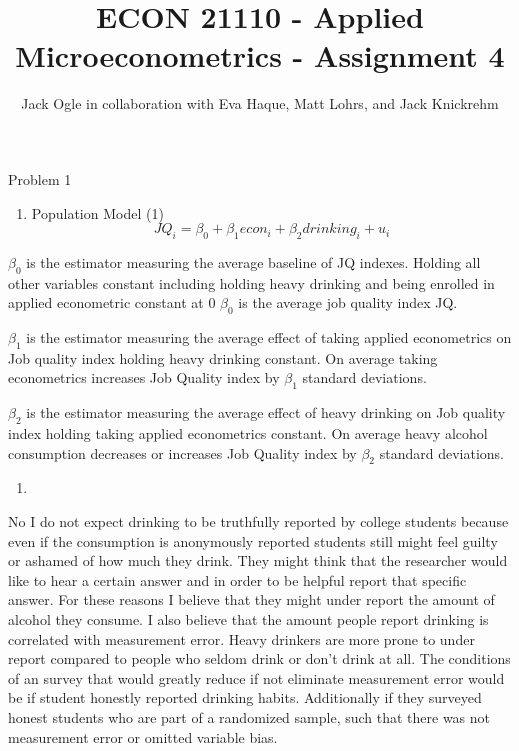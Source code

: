 \documentclass[
  12pt,
  landscape]{article}
\title{ECON 21110 - Applied Microeconometrics - Assignment 4}
\author{Jack Ogle in collaboration with Eva Haque, Matt Lohrs, and Jack
Knickrehm}
\date{}
\providecommand{\tightlist}{%
  \setlength{\itemsep}{0pt}\setlength{\parskip}{0pt}}
\begin{document}
\maketitle

Problem 1

\begin{enumerate}
\def\labelenumi{(\alph{enumi})}
\tightlist
\item
  Population Model (1) \[
  JQ_i = \beta_0 +\beta_1econ_i +\beta_2drinking_i +u_i
  \]
\end{enumerate}

\(\beta_0\) is the estimator measuring the average baseline of JQ
indexes. Holding all other variables constant including holding heavy
drinking and being enrolled in applied econometric constant at 0
\(\beta_0\) is the average job quality index JQ.

\(\beta_1\) is the estimator measuring the average effect of taking
applied econometrics on Job quality index holding heavy drinking
constant. On average taking econometrics increases Job Quality index by
\(\beta_1\) standard deviations.

\(\beta_2\) is the estimator measuring the average effect of heavy
drinking on Job quality index holding taking applied econometrics
constant. On average heavy alcohol consumption decreases or increases
Job Quality index by \(\beta_2\) standard deviations.

\begin{enumerate}
\def\labelenumi{(\alph{enumi})}
\setcounter{enumi}{1}
\item
\end{enumerate}

No I do not expect drinking to be truthfully reported by college
students because even if the consumption is anonymously reported
students still might feel guilty or ashamed of how much they drink. They
might think that the researcher would like to hear a certain answer and
in order to be helpful report that specific answer. For these reasons I
believe that they might under report the amount of alcohol they consume.
I also believe that the amount people report drinking is correlated with
measurement error. Heavy drinkers are more prone to under report
compared to people who seldom drink or don't drink at all. The
conditions of an survey that would greatly reduce if not eliminate
measurement error would be if student honestly reported drinking habits.
Additionally if they surveyed honest students who are part of a
randomized sample, such that there was not measurement error or omitted
variable bias.
\end{document}

